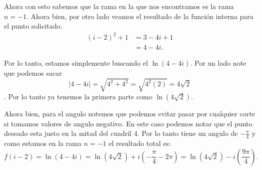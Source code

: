 \documentclass{report}
\begin{document}
Ahora con esto sabemos que la rama en la que nos encontramos es la rama $n = -1$. Ahora bien, por otro lado veamos el resultado de la función interna para el punto solicitado.
 \begin{align*}
  \left( i - 2 \right)^2 + 1 &= 3 - 4i + 1 \\
  &= 4 - 4i
.\end{align*}

Por lo tanto, estamos simplemente buscando el $\ln\left( 4 - 4i \right) $. Por un lado note que podemos sacar \[\left| 4 - 4i \right| = \sqrt{4^2 + 4^2} = \sqrt{4^2\left( 2 \right) } = 4\sqrt{2} \]. Por lo tanto ya tenemos la primera parte como $\ln\left( 4\sqrt{2}  \right) $. 

Ahora bien, para el angulo notemos que podemos evitar pasar por cualquier corte si tomamos valores de angulo negativo. En este caso podemos notar que el punto deseado esta justo en la mitad del cuadril 4. Por lo tanto tiene un angulo de $-\frac{\pi}{4}$ y como estamos en la rama $n = -1$ el resultado total es: \[
f\left( i - 2 \right) = \ln\left( 4 - 4i \right) = \ln\left( 4\sqrt{2}  \right) + i \left( -\frac{\pi}{4} - 2\pi \right) = \ln\left( 4\sqrt{2}  \right) - i \left( \frac{9\pi}{4} \right) 
.\] 
\end{document}
